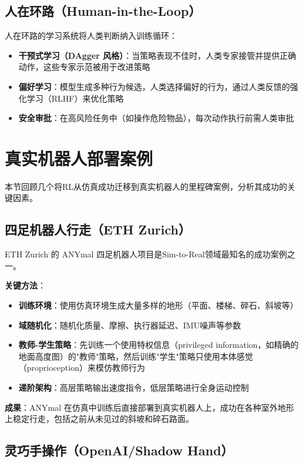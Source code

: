 \subsection{人在环路（Human-in-the-Loop）}

人在环路的学习系统将人类判断纳入训练循环：

\begin{itemize}
    \item \textbf{干预式学习（DAgger 风格）}：当策略表现不佳时，人类专家接管并提供正确动作，这些专家示范被用于改进策略
    \item \textbf{偏好学习}：模型生成多种行为候选，人类选择偏好的行为，通过人类反馈的强化学习（RLHF）来优化策略
    \item \textbf{安全审批}：在高风险任务中（如操作危险物品），每次动作执行前需人类审批
\end{itemize}

\section{真实机器人部署案例}

本节回顾几个将RL从仿真成功迁移到真实机器人的里程碑案例，分析其成功的关键因素。

\subsection{四足机器人行走（ETH Zurich）}

ETH Zurich 的 ANYmal 四足机器人项目是Sim-to-Real领域最知名的成功案例之一。

\textbf{关键方法}：
\begin{itemize}
    \item \textbf{训练环境}：使用仿真环境生成大量多样的地形（平面、楼梯、碎石、斜坡等）
    \item \textbf{域随机化}：随机化质量、摩擦、执行器延迟、IMU噪声等参数
    \item \textbf{教师-学生策略}：先训练一个使用特权信息（privileged information，如精确的地面高度图）的"教师"策略，然后训练"学生"策略只使用本体感觉（proprioception）来模仿教师行为
    \item \textbf{递阶架构}：高层策略输出速度指令，低层策略进行全身运动控制
\end{itemize}

\textbf{成果}：ANYmal 在仿真中训练后直接部署到真实机器人上，成功在各种室外地形上稳定行走，包括之前从未见过的斜坡和碎石路面。

\subsection{灵巧手操作（OpenAI/Shadow Hand）}

